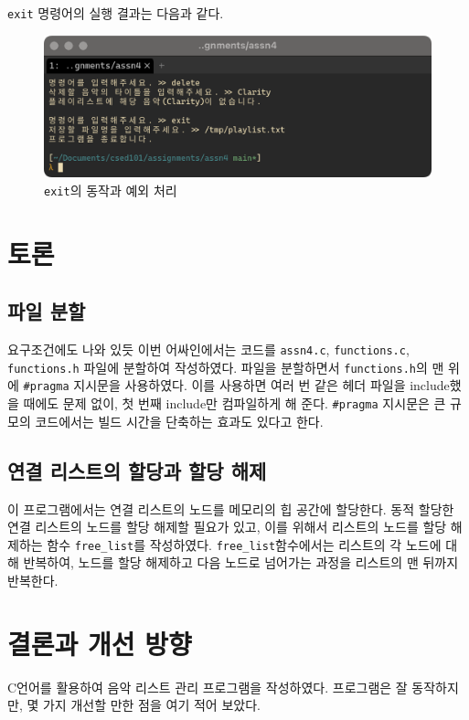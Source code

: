 \documentclass[titlepage]{article}
\begin{document}
\texttt{exit} 명령어의 실행 결과는 다음과 같다.

\begin{figure}[H]
  \centering
  \includegraphics[width=0.7\linewidth]{exit.png}
  \caption{\texttt{exit}의 동작과 예외 처리}
\end{figure}

\section{토론}

\subsection{파일 분할}

요구조건에도 나와 있듯 이번 어싸인에서는 코드를 \texttt{assn4.c}, \texttt{functions.c}, \texttt{functions.h} 파일에 분할하여 작성하였다. 파일을 분할하면서 \texttt{functions.h}의 맨 위에 \texttt{\#pragma} 지시문을 사용하였다. 이를 사용하면 여러 번 같은 헤더 파일을 include했을 때에도 문제 없이, 첫 번째 include만 컴파일하게 해 준다. \texttt{\#pragma} 지시문은 큰 규모의 코드에서는 빌드 시간을 단축하는 효과도 있다고 한다.

\subsection{연결 리스트의 할당과 할당 해제}

이 프로그램에서는 연결 리스트의 노드를 메모리의 힙 공간에 할당한다. 동적 할당한 연결 리스트의 노드를 할당 해제할 필요가 있고, 이를 위해서 리스트의 노드를 할당 해제하는 함수 \texttt{free\_list}를 작성하였다. \texttt{free\_list}함수에서는 리스트의 각 노드에 대해 반복하여, 노드를 할당 해제하고 다음 노드로 넘어가는 과정을 리스트의 맨 뒤까지 반복한다.

\section{결론과 개선 방향}

C언어를 활용하여 음악 리스트 관리 프로그램을 작성하였다. 프로그램은 잘 동작하지만, 몇 가지 개선할 만한 점을 여기 적어 보았다.
\end{document}
